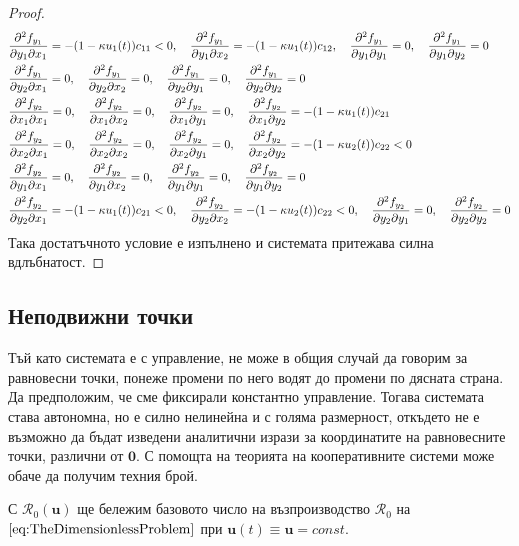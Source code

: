 \begin{proof}
{\begin{align*}
    &\pdv{f_{y_1}}{y_1}{x_1} = -(1-\kappa u_1(t))c_{11} < 0, \quad
    \pdv{f_{y_1}}{y_1}{x_2} = -(1-\kappa u_1(t))c_{12}, \quad
    \pdv{f_{y_1}}{y_1}{y_1} = 0, \quad
    \pdv{f_{y_1}}{y_1}{y_2} = 0 \\
    &\pdv{f_{y_1}}{y_2}{x_1} = 0, \quad
    \pdv{f_{y_1}}{y_2}{x_2} = 0, \quad
    \pdv{f_{y_1}}{y_2}{y_1} = 0, \quad
    \pdv{f_{y_1}}{y_2}{y_2} = 0 \\
    &\pdv{f_{y_2}}{x_1}{x_1} = 0, \quad
    \pdv{f_{y_2}}{x_1}{x_2} = 0, \quad
    \pdv{f_{y_2}}{x_1}{y_1} = 0, \quad
    \pdv{f_{y_2}}{x_1}{y_2} = -(1-\kappa u_1(t)) c_{21} \\
    &\pdv{f_{y_2}}{x_2}{x_1} = 0, \quad
    \pdv{f_{y_2}}{x_2}{x_2} = 0, \quad
    \pdv{f_{y_2}}{x_2}{y_1} = 0, \quad
    \pdv{f_{y_2}}{x_2}{y_2} = -(1-\kappa u_2(t)) c_{22} < 0 \\
    &\pdv{f_{y_2}}{y_1}{x_1} = 0, \quad
    \pdv{f_{y_2}}{y_1}{x_2} = 0, \quad
    \pdv{f_{y_2}}{y_1}{y_1} = 0, \quad
    \pdv{f_{y_2}}{y_1}{y_2} = 0 \\
    &\pdv{f_{y_2}}{y_2}{x_1} = -(1-\kappa u_1(t)) c_{21} < 0, \quad
    \pdv{f_{y_2}}{y_2}{x_2} = -(1-\kappa u_2(t)) c_{22} < 0, \quad
    \pdv{f_{y_2}}{y_2}{y_1} = 0, \quad
    \pdv{f_{y_2}}{y_2}{y_2} = 0
  \end{align*}
}
Така достатъчното условие е изпълнено и системата притежава силна вдлъбнатост.
\end{proof}


\subsection{Неподвижни точки}


Тъй като системата е с управление, не може в общия случай да говорим за равновесни точки, понеже промени по него водят до промени по дясната страна.
Да предположим, че сме фиксирали константно управление.
Тогава системата става автономна, но е силно нелинейна и с голяма размерност, откъдето не е възможно да бъдат изведени аналитични изрази за координатите на равновесните точки, различни от $\mathbf{0}$.
С помощта на теорията на кооперативните системи може обаче да получим техния брой.

\begin{definition}
  С $\mathscr{R}_0(\mathbf{u})$ ще бележим базовото число на възпроизводство $\mathscr{R}_0$ на $\eqref{eq:TheDimensionlessProblem}$ при $\mathbf{u}(t)\equiv \mathbf{u}=const$.
\end{definition}

